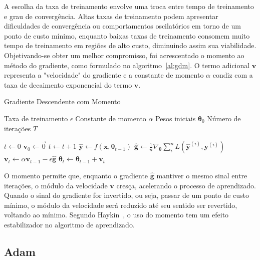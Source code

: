 A escolha da taxa de treinamento envolve uma troca entre tempo de treinamento e grau de convergência. Altas taxas de treinamento podem apresentar dificuldades de convergência ou comportamentos oscilatórios em torno de um ponto de custo mínimo, enquanto baixas taxas de treinamento consomem muito tempo de treinamento em regiões de alto custo, diminuindo assim sua viabilidade. Objetivando-se obter um melhor compromisso, foi acrescentado o momento ao método do gradiente, como formulado no algoritmo~\ref{al:gdm}. O termo adicional $\mathbf{v}$ representa a "velocidade" do gradiente e a constante de momento $\alpha$ condiz com a taxa de decaimento exponencial do termo $\mathbf{v}$.

\begin{algorithm}
    \caption{Gradiente Descendente com Momento}
    \label{al:gdm}
    \begin{algorithmic}
        \Require Taxa de treinamento $\epsilon$
        \Require Constante de momento $\alpha$
        \Require Pesos iniciais $\boldsymbol{\theta}_{0}$
        \Require Número de iterações $T$

        \State $t \gets 0$
        \State $\mathbf{v}_{0} \gets \vec{0}$
            \State $t \gets t + 1$
            \State $\mathbf{\hat{y}} \gets f(\mathbf{x}, \boldsymbol{\theta}_{t-1})$
            \State $\mathbf{\hat{g}} \gets \frac{1}{n} \nabla_{\boldsymbol{\theta}} \sum_i^n L(\mathbf{\hat{y}}^{(i)}, \mathbf{y}^{(i)})$
            \State $\mathbf{v}_{t} \gets \alpha \mathbf{v}_{t-1} - \epsilon \mathbf{\hat{g}}$
            \State $\boldsymbol{\theta}_{t} \gets \boldsymbol{\theta}_{t-1} + \mathbf{v}_t$
        \EndWhile
    \end{algorithmic}
\end{algorithm}

O momento permite que, enquanto o gradiente $\mathbf{\hat{g}}$ mantiver o mesmo sinal entre iterações, o módulo da velocidade $\mathbf{v}$ cresça, acelerando o processo de aprendizado. Quando o sinal do gradiente for invertido, ou seja, passar de um ponto de custo mínimo, o módulo da velocidade será reduzido até seu sentido ser revertido, voltando ao mínimo. Segundo Haykin~\cite{haykin09}, o uso do momento tem um efeito estabilizador no algoritmo de aprendizado.

\subsection{Adam}

